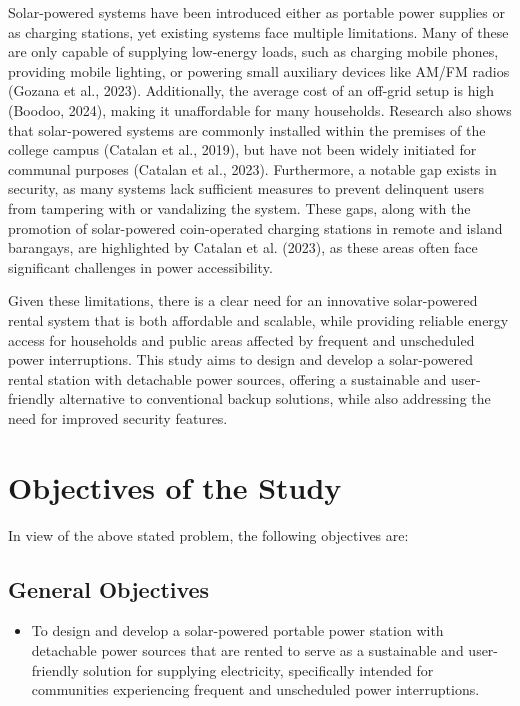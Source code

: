 {Solar-powered systems have been introduced either as portable power supplies or as charging stations, yet existing systems face multiple limitations. Many of these are only capable of supplying low-energy loads, such as charging mobile phones, providing mobile lighting, or powering small auxiliary devices like AM/FM radios (Gozana et al., 2023). Additionally, the average cost of an off-grid setup is high (Boodoo, 2024), making it unaffordable for many households. Research also shows that solar-powered systems are commonly installed within the premises of the college campus (Catalan et al., 2019), but have not been widely initiated for communal purposes (Catalan et al., 2023). Furthermore, a notable gap exists in security, as many systems lack sufficient measures to prevent delinquent users from tampering with or vandalizing the system. These gaps, along with the promotion of solar-powered coin-operated charging stations in remote and island barangays, are highlighted by Catalan et al. (2023), as these areas often face significant challenges in power accessibility.

Given these limitations, there is a clear need for an innovative solar-powered rental system that is both affordable and scalable, while providing reliable energy access for households and public areas affected by frequent and unscheduled power interruptions. This study aims to design and develop a solar-powered rental station with detachable power sources, offering a sustainable and user-friendly alternative to conventional backup solutions, while also addressing the need for improved security features.

\section{Objectives of the Study}

In view of the above stated problem, the following objectives are:
\subsection{General Objectives}
\begin{itemize}
	\item To design and develop a solar-powered portable power station with detachable power sources that are rented to serve as a sustainable and user-friendly solution for supplying electricity, specifically intended for communities experiencing frequent and unscheduled power interruptions. 
\end{itemize}
}
